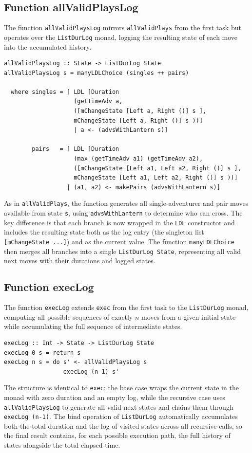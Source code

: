 \documentclass[a4paper,12pt]{report}
\begin{document}
\subsection{Function allValidPlaysLog}
The function \texttt{allValidPlaysLog} mirrors \texttt{allValidPlays}
from the first task but operates over the \texttt{ListDurLog} monad,
logging the resulting state of each move into the accumulated history.
\begin{verbatim}
allValidPlaysLog :: State -> ListDurLog State
allValidPlaysLog s = manyLDLChoice (singles ++ pairs)

  where singles = [ LDL [Duration
                    (getTimeAdv a,
                    ([mChangeState [Left a, Right ()] s ],
                    mChangeState [Left a, Right ()] s ))]
                    | a <- (advsWithLantern s)]

        pairs   = [ LDL [Duration
                    (max (getTimeAdv a1) (getTimeAdv a2),
                    ([mChangeState [Left a1, Left a2, Right ()] s ],
                    mChangeState [Left a1, Left a2, Right ()] s ))]
                  | (a1, a2) <- makePairs (advsWithLantern s)]
\end{verbatim}
As in \texttt{allValidPlays}, the function generates all single-adventurer
and pair moves available from state \texttt{s}, using
\texttt{advsWithLantern} to determine who can cross. The key difference
is that each branch is now wrapped in the \texttt{LDL} constructor and
includes the resulting state both as the log entry (the singleton list
\texttt{[mChangeState ...]}) and as the current value. The function
\texttt{manyLDLChoice} then merges all branches into a single
\texttt{ListDurLog State}, representing all valid next moves with their
durations and logged states.
\subsection{Function execLog}
The function \texttt{execLog} extends \texttt{exec} from the first task
to the \texttt{ListDurLog} monad, computing all possible sequences of
exactly $n$ moves from a given initial state while accumulating the full
sequence of intermediate states.
\begin{verbatim}
execLog :: Int -> State -> ListDurLog State
execLog 0 s = return s
execLog n s = do s' <- allValidPlaysLog s
                 execLog (n-1) s'
\end{verbatim}
The structure is identical to \texttt{exec}: the base case wraps the
current state in the monad with zero duration and an empty log, while
the recursive case uses \texttt{allValidPlaysLog} to generate all valid
next states and chains them through \texttt{execLog (n-1)}. The bind
operation of \texttt{ListDurLog} automatically accumulates both the
total duration and the log of visited states across all recursive calls,
so the final result contains, for each possible execution path, the full
history of states alongside the total elapsed time.
\end{document}
